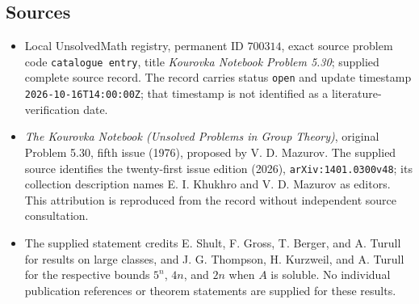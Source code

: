 \documentclass[11pt]{article}
\begin{document}
\subsection{Sources}
\begin{itemize}
\item Local UnsolvedMath registry, permanent ID \(700314\), exact source problem code \texttt{catalogue entry}, title \emph{Kourovka Notebook Problem 5.30}; supplied complete source record. The record carries status \texttt{open} and update timestamp \texttt{2026-10-16T14:00:00Z}; that timestamp is not identified as a literature-verification date.
\item \emph{The Kourovka Notebook (Unsolved Problems in Group Theory)}, original Problem 5.30, fifth issue (1976), proposed by V. D. Mazurov. The supplied source identifies the twenty-first issue edition (2026), \texttt{arXiv:1401.0300v48}; its collection description names E. I. Khukhro and V. D. Mazurov as editors. This attribution is reproduced from the record without independent source consultation.
\item The supplied statement credits E. Shult, F. Gross, T. Berger, and A. Turull for results on large classes, and J. G. Thompson, H. Kurzweil, and A. Turull for the respective bounds \(5^n\), \(4n\), and \(2n\) when \(A\) is soluble. No individual publication references or theorem statements are supplied for these results.
\end{itemize}
\end{document}
